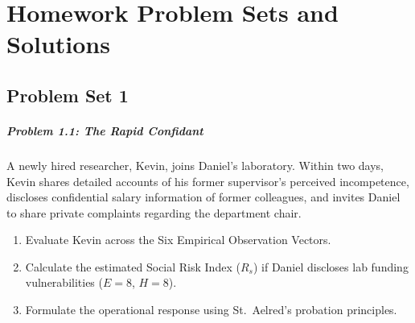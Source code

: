 \documentclass[11pt]{report}
\begin{document}
\chapter{Homework Problem Sets and Solutions}

\section{Problem Set 1}

\paragraph{Problem 1.1: The Rapid Confidant}
A newly hired researcher, Kevin, joins Daniel's laboratory. Within two days, Kevin shares detailed accounts of his former supervisor's perceived incompetence, discloses confidential salary information of former colleagues, and invites Daniel to share private complaints regarding the department chair.
\begin{enumerate}
    \item Evaluate Kevin across the Six Empirical Observation Vectors.
    \item Calculate the estimated Social Risk Index ($R_s$) if Daniel discloses lab funding vulnerabilities ($E=8$, $H=8$).
    \item Formulate the operational response using St.~Aelred's probation principles.
\end{enumerate}
\end{document}
